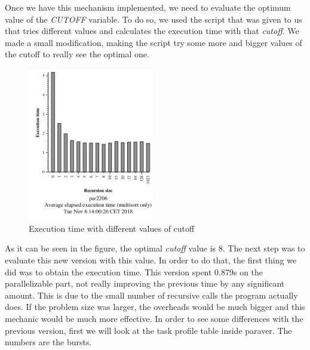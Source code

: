 \documentclass{article}
\begin{document}
\justify
Once we have this mechanism implemented, we need to evaluate the optimum value of the \textit{CUTOFF} variable. To do so, we used the script that was given to us that tries different values and calculates the execution time with that \textit{cutoff}. We made a small modification, making the script try some more and bigger values of the cutoff to really see the optimal one.

\begin{figure}[!h]
    \centering
    \includegraphics[width=0.5\textwidth]{cutoffEvaluation.png}
    \caption{Execution time with different values of cutoff }
    \label{fig:tareador}
\end{figure}

\justify
As it can be seen in the figure, the optimal \textit{cutoff} value is 8.
\clearpage
The next step was to evaluate this new version with this value. In order to do that, the first thing we did was to obtain the execution time. This version spent 0.879s on the parallelizable part, not really improving the previous time by any significant amount. This is due to the small number of recursive calls the program actually does. If the problem size was larger, the overheads would be much bigger and this mechanic would be much more effective.
\justify
In order to see some differences with the previous version, first we will look at the task profile table inside paraver. The numbers are the bursts.
\end{document}
